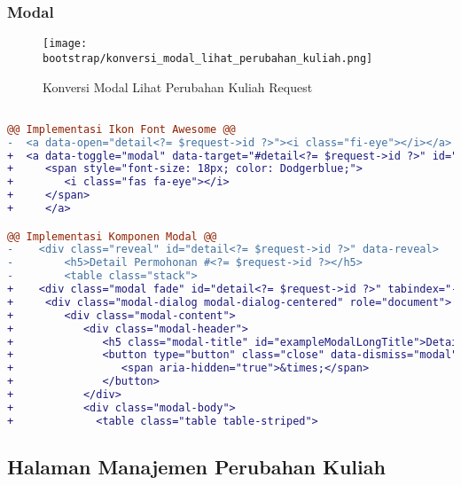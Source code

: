 \subsubsection{Modal}
\begin{figure} [H]
	\centering  
	\texttt{[image: bootstrap/konversi\_modal\_lihat\_perubahan\_kuliah.png]}
	\caption{Konversi Modal Lihat Perubahan Kuliah Request}
\end{figure}
\begin{lstlisting}[language=diff, label=Entri, basicstyle=\ttfamily, frame=single,
columns=fullflexible, keepspaces=true, breaklines=true]

@@ Implementasi Ikon Font Awesome @@
-  <a data-open="detail<?= $request->id ?>"><i class="fi-eye"></i></a>
+  <a data-toggle="modal" data-target="#detail<?= $request->id ?>" id="detailIkon<?= $request->id ?>">
+     <span style="font-size: 18px; color: Dodgerblue;">
+        <i class="fas fa-eye"></i>
+     </span>
+     </a>

@@ Implementasi Komponen Modal @@
-    <div class="reveal" id="detail<?= $request->id ?>" data-reveal>
-        <h5>Detail Permohonan #<?= $request->id ?></h5>
-        <table class="stack">
+    <div class="modal fade" id="detail<?= $request->id ?>" tabindex="-1" role="dialog" aria-hidden="true">
+     <div class="modal-dialog modal-dialog-centered" role="document">
+        <div class="modal-content">
+           <div class="modal-header">
+              <h5 class="modal-title" id="exampleModalLongTitle">Detail Permohonan #<?= $request->id ?></h5>
+              <button type="button" class="close" data-dismiss="modal" aria-label="Close">
+                 <span aria-hidden="true">&times;</span>
+              </button>
+           </div>
+           <div class="modal-body">
+             <table class="table table-striped">
\end{lstlisting}

\subsection{Halaman Manajemen Perubahan Kuliah}
